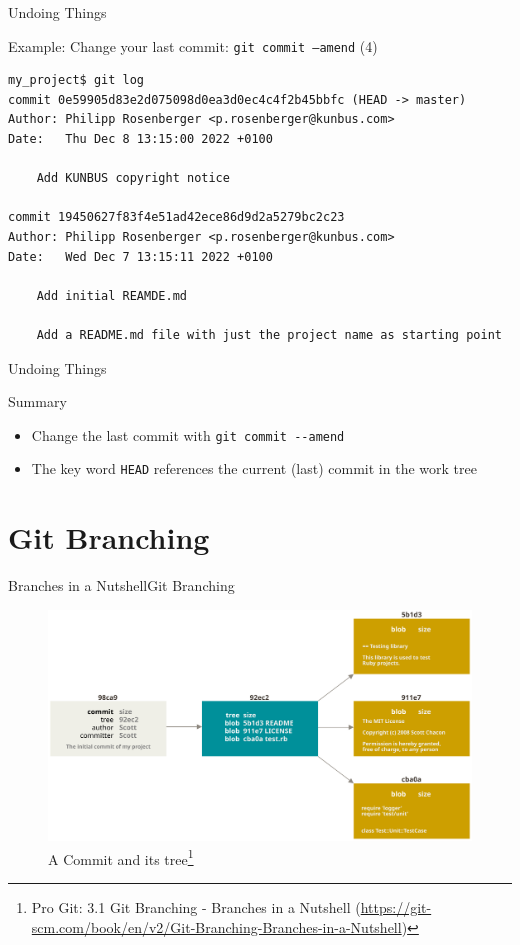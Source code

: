 \documentclass[aspectratio=169]{beamer}
\renewcommand{\footnotesize}{\tiny}
\newcommand{\sectiontitle}{}
\newcommand{\newsection}[1]{\renewcommand{\sectiontitle}{#1}\section{#1}}
\begin{document}
\begin{frame}[fragile]{Undoing Things}{\sectiontitle}
\begin{block}{Example: Change your last commit: \texttt{git commit --amend} {\small(4)}}
\begin{verbatim}
my_project$ git log
commit 0e59905d83e2d075098d0ea3d0ec4c4f2b45bbfc (HEAD -> master)
Author: Philipp Rosenberger <p.rosenberger@kunbus.com>
Date:   Thu Dec 8 13:15:00 2022 +0100

    Add KUNBUS copyright notice

commit 19450627f83f4e51ad42ece86d9d2a5279bc2c23
Author: Philipp Rosenberger <p.rosenberger@kunbus.com>
Date:   Wed Dec 7 13:15:11 2022 +0100

    Add initial REAMDE.md
    
    Add a README.md file with just the project name as starting point
\end{verbatim}
\end{block}
\end{frame}

\begin{frame}[fragile]{Undoing Things}{\sectiontitle}
\begin{block}{Summary}
\begin{itemize}
    \item Change the last commit with \verb|git commit --amend|
    \item The key word \verb|HEAD| references the current (last) commit in the work tree
\end{itemize}
\end{block}
\end{frame}


\newsection{Git Branching}
\begin{frame}{Branches in a Nutshell}{\sectiontitle}
\begin{figure}
    \centering
    \includegraphics[width=\textwidth,height=0.6\textheight,keepaspectratio]{commit-and-tree}
    \caption{
        A Commit and its tree\footnote{
            Pro Git: 3.1 Git Branching - Branches in a Nutshell
            (\url{https://git-scm.com/book/en/v2/Git-Branching-Branches-in-a-Nutshell})
        }
    }
\end{figure}
\end{frame}
\end{document}
